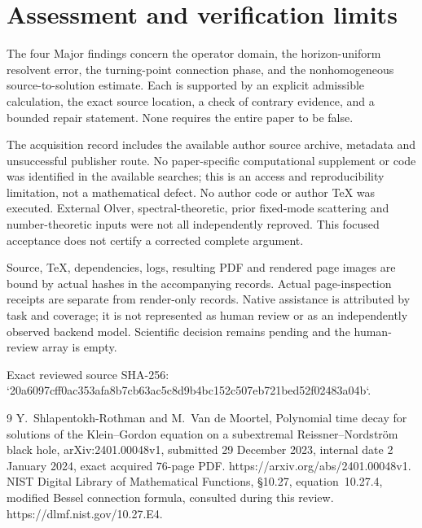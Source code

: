 \documentclass[10pt]{article}
\begin{document}
\section*{Assessment and verification limits}
The four Major findings concern the operator domain, the horizon-uniform resolvent error, the turning-point connection phase, and the nonhomogeneous source-to-solution estimate. Each is supported by an explicit admissible calculation, the exact source location, a check of contrary evidence, and a bounded repair statement. None requires the entire paper to be false.\par
The acquisition record includes the available author source archive, metadata and unsuccessful publisher route. No paper-specific computational supplement or code was identified in the available searches; this is an access and reproducibility limitation, not a mathematical defect. No author code or author TeX was executed. External Olver, spectral-theoretic, prior fixed-mode scattering and number-theoretic inputs were not all independently reproved. This focused acceptance does not certify a corrected complete argument.\par
Source, TeX, dependencies, logs, resulting PDF and rendered page images are bound by actual hashes in the accompanying records. Actual page-inspection receipts are separate from render-only records. Native assistance is attributed by task and coverage; it is not represented as human review or as an independently observed backend model. Scientific decision remains pending and the human-review array is empty.\par
Exact reviewed source SHA-256: `20a6097cff0ac353afa8b7cb63ac5c8d9b4bc152c507eb721bed52f02483a04b`.\par
9 Y. Shlapentokh-Rothman and M. Van de Moortel, Polynomial time decay for solutions of the Klein–Gordon equation on a subextremal Reissner–Nordström black hole, arXiv:2401.00048v1, submitted 29 December 2023, internal date 2 January 2024, exact acquired 76-page PDF. https://arxiv.org/abs/2401.00048v1. NIST Digital Library of Mathematical Functions, §10.27, equation 10.27.4, modified Bessel connection formula, consulted during this review. https://dlmf.nist.gov/10.27.E4.\par
\end{document}
